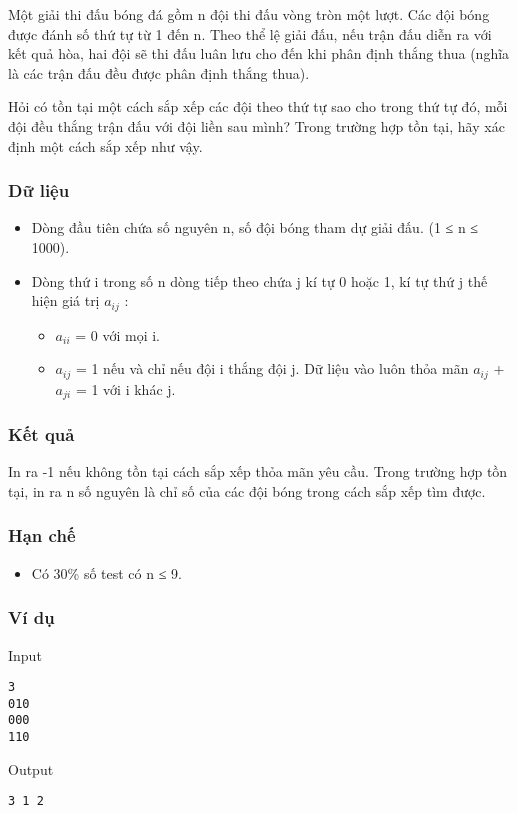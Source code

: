 

Một giải thi đấu bóng đá gồm n đội thi đấu vòng tròn một lượt. Các đội bóng được đánh số thứ tự từ 1 đến n. Theo thể lệ giải đấu, nếu trận đấu diễn ra với kết quả hòa, hai đội sẽ thi đấu luân lưu cho đến khi phân định thắng thua (nghĩa là các trận đấu đều được phân định thắng thua).

Hỏi có tồn tại một cách sắp xếp các đội theo thứ tự sao cho trong thứ tự đó, mỗi đội đều thắng trận đấu với đội liền sau mình? Trong trường hợp tồn tại, hãy xác định một cách sắp xếp như vậy.

\subsubsection{Dữ liệu}
\begin{itemize}
	\item Dòng đầu tiên chứa số nguyên n, số đội bóng tham dự giải đấu. (1 ≤ n ≤ 1000).
	\item Dòng thứ i trong số n dòng tiếp theo chứa j kí tự 0 hoặc 1, kí tự thứ j thế hiện giá trị $a_{ij}$ :
\begin{itemize}
	\item $a_{ii}$ = 0 với mọi i.
	\item $a_{ij}$ = 1 nếu và chỉ nếu đội i thắng đội j. Dữ liệu vào luôn thỏa mãn $a_{ij}$ +$a_{ji}$ = 1 với i khác j.
\end{itemize}
\end{itemize}

\subsubsection{Kết quả}

In ra -1 nếu không tồn tại cách sắp xếp thỏa mãn yêu cầu. Trong trường hợp tồn tại, in ra n số nguyên là chỉ số của các đội bóng trong cách sắp xếp tìm được.

\subsubsection{Hạn chế}
\begin{itemize}
	\item Có 30\% số test có n ≤ 9.
\end{itemize}

\subsubsection{Ví dụ}

Input
\begin{verbatim}
3
010
000
110\end{verbatim}

Output
\begin{verbatim}
3 1 2\end{verbatim}
